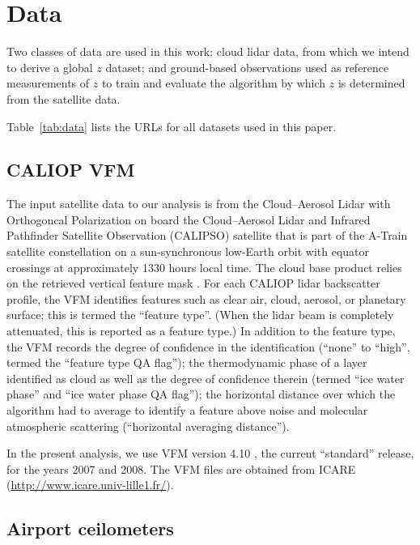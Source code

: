 \documentclass[essd,manuscript]{copernicus}
\begin{document}
\section{Data}
\label{sec:data}

Two classes of data are used in this work: cloud lidar data, from which we
intend to derive a global \ensuremath{z}{} dataset; and ground-based observations used as
reference measurements of \ensuremath{z}{} to train and evaluate the algorithm by which
\ensuremath{z}{} is determined from the satellite data.

Table~\ref{tab:data} lists the URLs for all datasets used in this paper.

\subsection{CALIOP VFM}

The input satellite data to our analysis is from the Cloud--Aerosol Lidar with
Orthogoncal Polarization \citep[CALIOP,][]{Winker2007} on board the Cloud--Aerosol Lidar and Infrared Pathfinder
Satellite Observation (CALIPSO) satellite that is part of the A-Train
satellite constellation \citep{Stephens2002} on a
sun-synchronous low-Earth orbit with equator crossings at approximately 1330 hours local
time. The cloud base product relies on the retrieved vertical feature mask
\citep[VFM,][]{vaughan2002}.  For each CALIOP lidar backscatter profile, the VFM identifies features
such as clear air, cloud, aerosol, or planetary surface; this is termed the ``feature
type''.  (When the lidar beam is completely attenuated, this is reported as a
feature type.)  In addition to the feature type, the VFM records the degree of
confidence in the identification (``none'' to ``high'', termed the ``feature
type QA flag''); the thermodynamic phase of a layer identified as cloud as well
as the degree of confidence therein (termed ``ice water phase'' and ``ice water
phase QA flag''); the horizontal distance over which the algorithm had to
average to identify a feature above noise and molecular atmospheric scattering
(``horizontal averaging distance'').  

In the present analysis, we use VFM version 4.10 \citep{vfm}, the current
``standard'' release, for the years 2007 and 2008.  The VFM files are obtained
from ICARE (\url{http://www.icare.univ-lille1.fr/}).

\subsection{Airport ceilometers}
\end{document}
